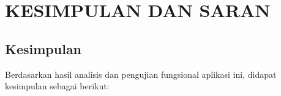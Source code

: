 \chapter{KESIMPULAN DAN SARAN}

\section{Kesimpulan}
\noindent Berdasarkan hasil analisis dan pengujian fungsional aplikasi ini, didapat kesimpulan sebagai berikut:











\begin{comment}

\end{comment}
